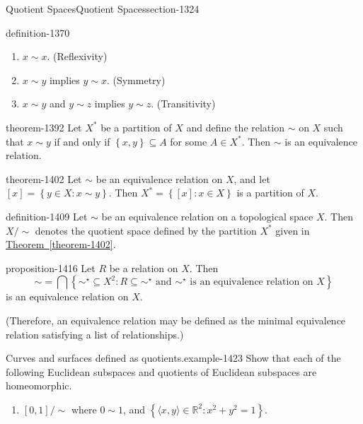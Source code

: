 \documentclass[oneside,10pt,]{article}
\newcommand{\tuple}[1]{\langle #1 \rangle}
\newcommand{\mb}{\mathbb}
\newcommand{\setBuilder}[2]{\left\{#1:#2\right\}}
\newcommand{\setList}[1]{\left\{#1\right\}}
\begin{document}
\begin{sectionptx}{Quotient Spaces}{}{Quotient Spaces}{}{}{section-1324}
\begin{definition}{}{definition-1370}
\leavevmode%
\begin{enumerate}
\item\hypertarget{li-1383}{}\(x\sim x\). (Reflexivity)%
\item\hypertarget{li-1385}{}\(x\sim y\) implies \(y\sim x\). (Symmetry)%
\item\hypertarget{li-1388}{}\(x\sim y\) and \(y\sim z\) implies \(y\sim z\). (Transitivity)%
\end{enumerate}
\end{definition}
\begin{theorem}{}{}{theorem-1392}%
\hypertarget{p-1393}{}%
Let \(X^*\) be a partition of \(X\) and define the relation \(\sim\) on \(X\) such that \(x\sim y\) if and only if \(\setList{x,y}\subseteq A\) for some \(A\in X^*\). Then \(\sim\) is an equivalence relation.%
\end{theorem}
\begin{theorem}{}{}{theorem-1402}%
\hypertarget{p-1403}{}%
Let \(\sim\) be an equivalence relation on \(X\), and let \([x]=\setBuilder{y\in X}{x\sim y}\). Then \(X^*=\setBuilder{[x]}{x\in X}\) is a partition of \(X\).%
\end{theorem}
\begin{definition}{}{definition-1409}%
\hypertarget{p-1410}{}%
Let \(\sim\) be an equivalence relation on a topological space \(X\). Then \(X/\sim\) denotes the quotient space defined by the partition \(X^*\) given in \hyperref[theorem-1402]{Theorem~\ref{theorem-1402}}.%
\end{definition}
\begin{proposition}{}{}{proposition-1416}%
\hypertarget{p-1417}{}%
Let \(R\) be a relation on \(X\). Then%
\begin{equation*}
\sim=\bigcap\setBuilder{\sim^\star\subseteq X^2}{R\subseteq\sim^\star\text{ and }\sim^\star
\text{ is an equivalence relation on }X}
\end{equation*}
is an equivalence relation on \(X\).%
\par
\hypertarget{p-1422}{}%
(Therefore, an equivalence relation may be defined as the minimal equivalence relation satisfying a list of relationships.)%
\end{proposition}
\begin{example}{Curves and surfaces defined as quotients.}{example-1423}%
\hypertarget{p-1425}{}%
Show that each of the following Euclidean subspaces and quotients of Euclidean subspaces are homeomorphic.%
\leavevmode%
\begin{enumerate}
\item\hypertarget{li-1427}{}\([0,1]/\sim\) where \(0\sim 1\), and \(\setBuilder{\tuple{x,y}\in\mb R^2}{x^2+y^2=1}\).%

\end{enumerate}
\end{example}
\end{sectionptx}
\end{document}

